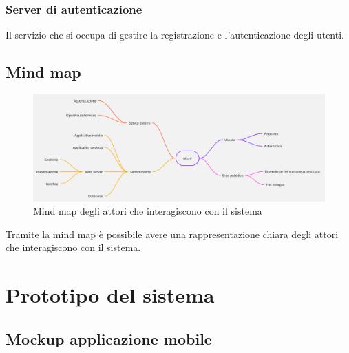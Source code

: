 \documentclass{article}
\begin{document}
\subsubsection{Server di autenticazione}
\label{3.4.1}
Il servizio che si occupa di gestire la registrazione e l'autenticazione degli utenti.

\clearpage

\subsection{Mind map}

\begin{figure}[htbp]
    \label{fig:Mind_map}
    \centering
    \includegraphics[width=1\textwidth]{Images/BeeLive-MindMap.jpg}
    \caption{Mind map degli attori che interagiscono con il sistema}
\end{figure}

Tramite la mind map è possibile avere una rappresentazione chiara degli attori che interagiscono con il sistema.\\
\clearpage

\section{Prototipo del sistema}

\subsection{Mockup applicazione mobile}
\end{document}
